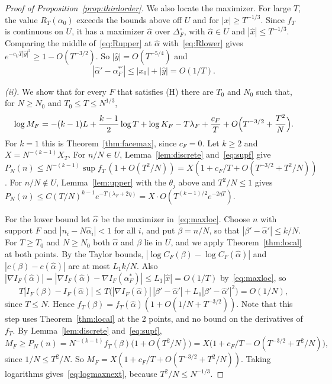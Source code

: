 \begin{proof}[Proof of Proposition~\ref{prop:thirdorder}]
We also locate the maximizer. For large $T$, the value $R_T(\alpha_0)$ exceeds
the bounds above off $U$ and for $|x|\ge T^{-1/3}$. Since $f_T$ is continuous
on $U$, it has a maximizer $\hat\alpha$ over $\Delta_F^\circ$, with
$\hat\alpha\in U$ and $|\hat x|\le T^{-1/3}$. Comparing the middle
of~\eqref{eq:Rupper} at $\hat\alpha$ with~\eqref{eq:Rlower} gives
$e^{-c_UT|\hat y|^2}\ge1-O(T^{-3/2})$. So $|\hat y|=O(T^{-5/4})$ and
\begin{equation}\label{eq:maxloc}
|\hat\alpha'-\alpha^{*\prime}_F|\le|x_0|+|\hat y|=O(1/T).
\end{equation}

\emph{(ii).} We show that for every $F$ that satisfies (H) there are $T_0$
and $N_0$ such that, for $N\ge N_0$ and $T_0\le T\le N^{1/3}$,
\begin{equation}\label{eq:logmaxnext}
\log M_F=-(k-1)L+\frac{k-1}2\log T+\log K_F-T\lambda_F+\frac{c_F}T
+O\Bigl(T^{-3/2}+\frac{T^2}N\Bigr).
\end{equation}
For $k=1$ this is Theorem~\ref{thm:facemax}, since $c_F=0$. Let $k\ge2$ and
$X=N^{-(k-1)}X_T$. For $n/N\in U$, Lemma~\ref{lem:discrete}
and~\eqref{eq:supf} give
$P_N(n)\le N^{-(k-1)}\sup f_T\,(1+O(T^2/N))
=X(1+c_F/T+O(T^{-3/2}+T^2/N))$. For $n/N\notin U$, Lemma~\ref{lem:upper}
with the $\theta_j$ above and $T^2/N\le1$ gives
$P_N(n)\le C(T/N)^{k-1}e^{-T(\lambda_F+2\eta)}=X\cdot
O(T^{(k-1)/2}e^{-2\eta T})$.

For the lower bound let $\hat\alpha$ be the maximizer
in~\eqref{eq:maxloc}. Choose $n$ with support $F$ and
$|n_i-N\hat\alpha_i|<1$ for all $i$, and put $\beta=n/N$, so that
$|\beta'-\hat\alpha'|\le k/N$. For $T\ge T_0$ and $N\ge N_0$ both $\hat\alpha$
and $\beta$ lie in $U$, and we apply Theorem~\ref{thm:local} at both points.
By the Taylor bounds, $|\log C_F(\beta)-\log C_F(\hat\alpha)|$ and
$|c(\beta)-c(\hat\alpha)|$ are at most $L_1k/N$. Also
$|\nabla I_F(\hat\alpha)|=|\nabla I_F(\hat\alpha)-\nabla I_F(\alpha^*_F)|
\le L_1|\hat x|=O(1/T)$ by~\eqref{eq:maxloc}, so
\[
T|I_F(\beta)-I_F(\hat\alpha)|\le T\bigl(|\nabla I_F(\hat\alpha)|\,
|\beta'-\hat\alpha'|+L_1|\beta'-\hat\alpha'|^2\bigr)=O(1/N),
\]
since $T\le N$. Hence $f_T(\beta)=f_T(\hat\alpha)(1+O(1/N+T^{-3/2}))$. Note
that this step uses Theorem~\ref{thm:local} at the 2 points, and no bound on
the derivatives of $f_T$. By Lemma~\ref{lem:discrete} and~\eqref{eq:supf},
\[
M_F\ge P_N(n)=N^{-(k-1)}f_T(\beta)\bigl(1+O(T^2/N)\bigr)
=X\bigl(1+c_F/T-O(T^{-3/2}+T^2/N)\bigr),
\]
since $1/N\le T^2/N$. So $M_F=X(1+c_F/T+O(T^{-3/2}+T^2/N))$. Taking
logarithms gives~\eqref{eq:logmaxnext}, because $T^2/N\le N^{-1/3}$.


\end{proof}
